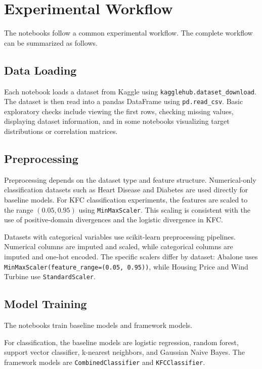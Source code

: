 \section{Experimental Workflow}
\label{sec:experimental_workflow}

The notebooks follow a common experimental workflow. The complete workflow can be summarized as follows.

\subsection{Data Loading}

Each notebook loads a dataset from Kaggle using \texttt{kagglehub.dataset\_download}. The dataset is then read into a pandas DataFrame using \texttt{pd.read\_csv}. Basic exploratory checks include viewing the first rows, checking missing values, displaying dataset information, and in some notebooks visualizing target distributions or correlation matrices.

\subsection{Preprocessing}

Preprocessing depends on the dataset type and feature structure. Numerical-only classification datasets such as Heart Disease and Diabetes are used directly for baseline models. For KFC classification experiments, the features are scaled to the range $(0.05, 0.95)$ using \texttt{MinMaxScaler}. This scaling is consistent with the use of positive-domain divergences and the logistic divergence in KFC.

Datasets with categorical variables use scikit-learn preprocessing pipelines. Numerical columns are imputed and scaled, while categorical columns are imputed and one-hot encoded. The specific scalers differ by dataset: Abalone uses \texttt{MinMaxScaler(feature\_range=(0.05, 0.95))}, while Housing Price and Wind Turbine use \texttt{StandardScaler}.

\subsection{Model Training}

The notebooks train baseline models and framework models.

For classification, the baseline models are logistic regression, random forest, support vector classifier, k-nearest neighbors, and Gaussian Naive Bayes. The framework models are \texttt{CombinedClassifier} and \texttt{KFCClassifier}.

